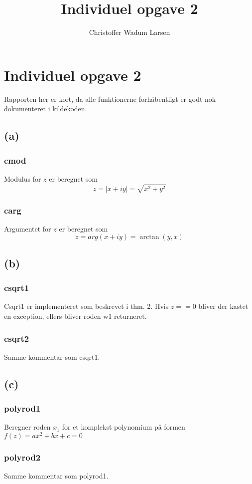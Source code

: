 \documentclass[12pt]{article}
\title{Individuel opgave 2}
\author{Christoffer Wadum Larsen}
\begin{document}
\maketitle

\section{Individuel opgave 2}

Rapporten her er kort, da alle funktionerne forhåbentligt er godt nok dokumenteret i kildekoden.

\subsection{(a)}

\subsubsection{cmod}

Modulus for $z$ er beregnet som \[z = |x+iy| = \sqrt{x^2 + y^2}\]

\subsubsection{carg}

Argumentet for $z$ er beregnet som \[z = arg(x+iy) = \arctan(y,x)\]

\subsection{(b)}
\subsubsection{csqrt1}
Csqrt1 er implementeret som beskrevet i thm. 2. Hvis $z == 0$ bliver der kastet en exception, ellers bliver roden w1 returneret.
\subsubsection{csqrt2}
Samme kommentar som csqrt1.

\subsection{(c)}
\subsubsection{polyrod1}
Beregner roden $x_1$ for et komplekst polynomium på formen $f(z) = ax^2+bx+c = 0$
\subsubsection{polyrod2}
Samme kommentar som polyrod1.
\end{document}
